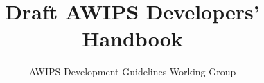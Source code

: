 \documentclass[letterpaper]{book}
\author{AWIPS Development Guidelines Working Group}
\title{Draft AWIPS Developers' Handbook}
\begin{document}
\maketitle

\tableofcontents

\setlength{\parskip}{1ex}
\setlength{\parindent}{0em}

\begin{raggedright}














\appendix






\end{raggedright}
\end{document}
